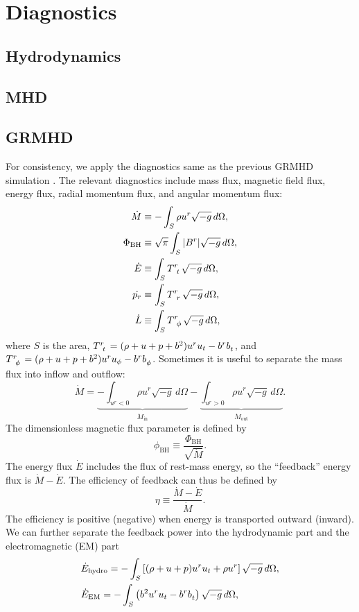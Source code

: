 \documentclass[%
 reprint,
 superscriptaddress,
 amsmath,amssymb,
 nofootinbib,
 prd,
]{revtex4-2}
\begin{document}
\section{Diagnostics}

\subsection{Hydrodynamics}

\subsection{MHD}

\subsection{GRMHD}
For consistency, we apply the diagnostics same as the previous GRMHD simulation \cite{Guo:2025sjb}. The relevant diagnostics include mass flux, magnetic field flux, energy flux, radial momentum flux, and angular momentum flux:
\begin{align}
    \dot{M}&\equiv-\int_S \rho u^r\sqrt{-g}\,d \Omega,\\
    \Phi_\mathrm{BH}&\equiv \sqrt{\pi} \int_S |B^r|\sqrt{-g}\,d\Omega,\\
    \dot{E}&\equiv \int_S \tensor{T}{^r_t}\sqrt{-g}\,d\Omega,\\
    \dot{p_r}&\equiv \int_S \tensor{T}{^r_r}\sqrt{-g}\,d\Omega,\\
    \dot{L}&\equiv \int_S \tensor{T}{^r_\phi}\sqrt{-g}\,d\Omega,
\end{align}
where $S$ is the area, $\tensor{T}{^r_t}=(\rho+u+p+b^2)u^{r}u_{t}-\tensor{b}{^r}\tensor{b}{_t}$, and $\tensor{T}{^r_\phi}=(\rho+u+p+b^2)u^{r}u_{\phi}-\tensor{b}{^r}\tensor{b}{_\phi}$.
Sometimes it is useful to separate the mass flux into inflow and outflow:
\begin{equation}
    \dot{M}=\underbrace{-\int_{u^r<0}\rho u^r\sqrt{-g}\,d \Omega}_{\dot{M}_\mathrm{in}}-\underbrace{\int_{u^r>0}\rho u^r\sqrt{-g}\,d \Omega}_{\dot{M}_\mathrm{out}}.
\end{equation}
The dimensionless magnetic flux parameter is defined by
\begin{equation}
    \phi_\mathrm{BH}\equiv\frac{\Phi_\mathrm{BH}}{\sqrt{\dot{M}}}.
\end{equation}
The energy flux $\dot{E}$ includes the flux of rest-mass energy, so the ``feedback'' energy flux is $\dot{M}-\dot{E}$. The efficiency of feedback can thus be defined by
\begin{equation}
    \eta\equiv \frac{\dot{M}-\dot{E}}{\dot{M}}.
\end{equation}
The efficiency is positive (negative) when energy is transported outward (inward). We can further separate the feedback power into the hydrodynamic part and the electromagnetic (EM) part
\begin{align}
    &\dot{E}_\mathrm{hydro}=-\int_S \left[(\rho+u+p)u^{r}u_{t}+\rho u^r\right]\sqrt{-g}\,d\Omega, \\
    &\dot{E}_\mathrm{EM}=-\int_S \left(b^2u^{r}u_{t}-\tensor{b}{^r}\tensor{b}{_t}\right)\sqrt{-g}\,d\Omega,
\end{align}
\end{document}
